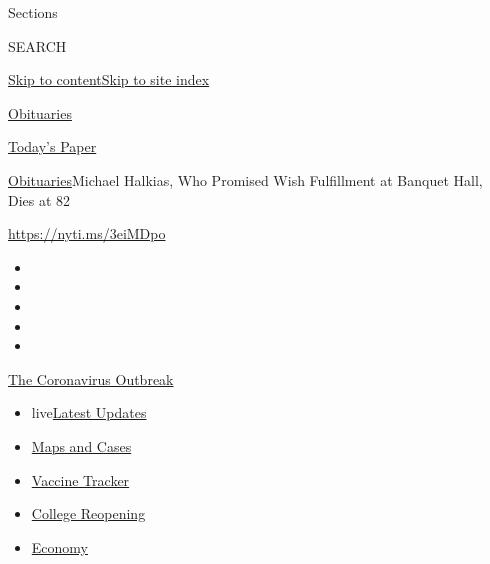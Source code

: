 Sections

SEARCH

\protect\hyperlink{site-content}{Skip to
content}\protect\hyperlink{site-index}{Skip to site index}

\href{https://www.nytimes3xbfgragh.onion/section/obituaries}{Obituaries}

\href{https://myaccount.nytimes3xbfgragh.onion/auth/login?response_type=cookie\&client_id=vi}{}

\href{https://www.nytimes3xbfgragh.onion/section/todayspaper}{Today's
Paper}

\href{/section/obituaries}{Obituaries}\textbar{}Michael Halkias, Who
Promised Wish Fulfillment at Banquet Hall, Dies at 82

\url{https://nyti.ms/3eiMDpo}

\begin{itemize}
\item
\item
\item
\item
\item
\end{itemize}

\href{https://www.nytimes3xbfgragh.onion/news-event/coronavirus?action=click\&pgtype=Article\&state=default\&region=TOP_BANNER\&context=storylines_menu}{The
Coronavirus Outbreak}

\begin{itemize}
\tightlist
\item
  live\href{https://www.nytimes3xbfgragh.onion/2020/08/04/world/coronavirus-covid-19.html?action=click\&pgtype=Article\&state=default\&region=TOP_BANNER\&context=storylines_menu}{Latest
  Updates}
\item
  \href{https://www.nytimes3xbfgragh.onion/interactive/2020/us/coronavirus-us-cases.html?action=click\&pgtype=Article\&state=default\&region=TOP_BANNER\&context=storylines_menu}{Maps
  and Cases}
\item
  \href{https://www.nytimes3xbfgragh.onion/interactive/2020/science/coronavirus-vaccine-tracker.html?action=click\&pgtype=Article\&state=default\&region=TOP_BANNER\&context=storylines_menu}{Vaccine
  Tracker}
\item
  \href{https://www.nytimes3xbfgragh.onion/2020/08/02/us/covid-college-reopening.html?action=click\&pgtype=Article\&state=default\&region=TOP_BANNER\&context=storylines_menu}{College
  Reopening}
\item
  \href{https://www.nytimes3xbfgragh.onion/live/2020/08/03/business/stock-market-today-coronavirus?action=click\&pgtype=Article\&state=default\&region=TOP_BANNER\&context=storylines_menu}{Economy}
\end{itemize}

